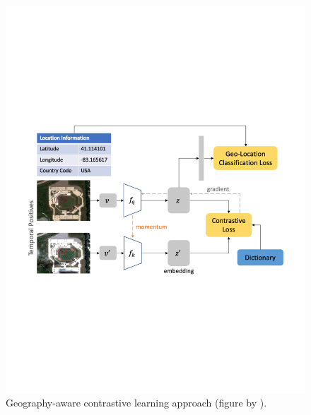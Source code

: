 \begin{figure}
\begin{minipage}[t]{0.44\linewidth}
    \includegraphics[width=\linewidth]{figures/ap2.pdf}
    \caption{Geography-aware contrastive learning approach (figure by \cite{geoAwareSelfSuper}).}
    \label{fig:geography_aware}
\end{minipage}
\end{figure}

